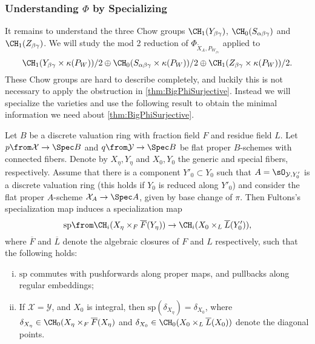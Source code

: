 \subsubsection{Understanding  $\Phi$ by Specializing}
It remains to understand the three Chow groups $\CH_1(Y_{\beta \gamma})$, $\CH_0(S_{\alpha \beta \gamma})$ and $\CH_1(Z_{\beta \gamma})$. We will study the mod 2 reduction of $\Phi_{\widetilde{X}_A,P_{W_{\beta \gamma}}}$ applied to
\[\CH_1(Y_{\beta \gamma} \times \kappa(P_W))/2 \oplus \CH_0(S_{\alpha \beta \gamma} \times \kappa(P_W))/2 \oplus \CH_1(Z_{\beta \gamma} \times \kappa(P_W))/2.\]
These Chow groups are hard to describe completely, and luckily this is not necessary to apply the obstruction in \cref{thm:BigPhiSurjective}. Instead we will specialize the varieties and use the following result to obtain the minimal information we need about \cref{thm:BigPhiSurjective}.
\begin{lemma}
	\label{lem:SpecializationFulton}
	Let $B$ be a discrete valuation ring with fraction field $F$ and residue field $L$. Let $p \from \mathcal{X} \to \Spec B$ and $q \from \mathcal{Y} \to \Spec B$ be flat proper $B$-schemes with connected fibers. Denote by $X_\eta,Y_\eta$ and $X_0,Y_0$ the generic and special fibers, respectively. Assume that there is a component $Y'_0 \subset Y_0$ such that $A = \sO_{\mathcal{Y},Y'_0}$ is a discrete valuation ring (this holds if $Y_0$ is reduced along $Y'_0$) and consider the flat proper $A$-scheme $\mathcal{X}_A \to \Spec A$, given by base change of $\pi$. Then Fultons's specialization map induces a specialization map
	\[\mathrm{sp} \from \CH_i(X_\eta \times_F \overline{F}(Y_\eta)) \to \CH_i(X_0 \times_L \overline{L}(Y'_0)), \]
	where $\overline{F}$ and $\overline{L}$ denote the algebraic closures of $F$ and $L$ respectively, such that the following holds:
	\begin{enumerate}[i)]
		\item $\mathrm{sp}$ commutes with pushforwards along proper maps, and pullbacks along regular embeddings;
		\item If $\mathcal{X} = \mathcal{Y}$, and $X_0$ is integral, then $\mathrm{sp}(\delta_{X_{\eta}}) = \delta_{X_0}$, where $\delta_{X_{\eta}} \in \CH_0(X_{\eta} \times_F \overline{F}(X_{\eta})$ and $\delta_{X_0} \in \CH_0(X_0 \times_L \overline{L}(X_0))$ denote the diagonal points.
	\end{enumerate}
\end{lemma}


